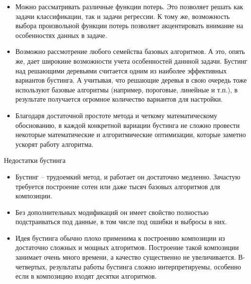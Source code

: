 \begin{itemize}
    \item Можно рассматривать различные функции потерь. Это позволяет решать как задачи классификации, так и задачи регрессии. К тому же, возможность выбора произвольной функции потерь позволяет акцентировать внимание на особенностях данных в задаче.

    \item Возможно рассмотрение любого семейства базовых алгоритмов. А это, опять же, дает широкиие возможности учета особенностей даннной задачи. Бустинг над решающими деревьями считается одним из наиболее эффективных вариантов бустинга. А учитывая, что решающие деревья в свою очередь тоже используют базовые алгоритмы (например, пороговые, линейные и т.п.), в результате получается огромное количество вариантов для настройки.

    \item Благодаря достаточной простоте метода и четкому математическому обоснованию, в каждой конкретной вариации бустинга не сложно провести некоторые математические и алгоритмические оптимизации, которые заметно ускорят работу алгоритма.
\end{itemize}

Недостатки бустинга

\begin{itemize}

\item Бустинг – трудоемкий метод, и работает он достаточно медленно. Зачастую требуется построение сотен или даже тысяч базовых алгоритмов для композиции. 

\item Без дополнительных модификаций он имеет свойство полностью подстраиваться под данные, в том числе под ошибки и выбросы в них.

\item Идея бустинга обычно плохо применима к построению композиции из достаточно сложных и мощных алгоритмов. Построение такой композиции занимает очень много времени, а качество существенно не увеличивается. В-четвертых, результаты работы бустинга сложно интерпретируемы, особенно если в композицию входят десятки алгоритмов.

\end{itemize}